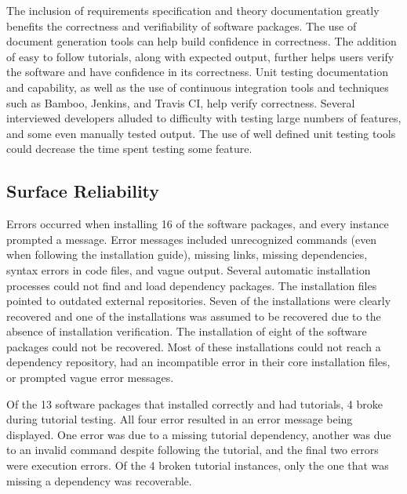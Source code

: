 \documentclass[12pt, notitlepage]{article}
\begin{document}
The inclusion of requirements specification and theory documentation greatly benefits the correctness and verifiability of software packages. The use of document generation tools can help build confidence in correctness. The addition of easy to follow tutorials, along with expected output, further helps users verify the software and have confidence in its correctness. Unit testing documentation and capability, as well as the use of continuous integration tools and techniques such as Bamboo, Jenkins, and Travis CI, help verify correctness. Several interviewed developers alluded to difficulty with testing large numbers of features, and some even manually tested output. The use of well defined unit testing tools could decrease the time spent testing some feature.

\subsection{Surface Reliability}

Errors occurred when installing 16 of the software packages, and every instance prompted a message. Error messages included unrecognized commands (even when following the installation guide), missing links, missing dependencies, syntax errors in code files, and vague output. Several automatic installation processes could not find and load dependency packages. The installation files pointed to outdated external repositories. Seven of the installations were clearly recovered and one of the installations was assumed to be recovered due to the absence of installation verification. The installation of eight of the software packages could not be recovered. Most of these installations could not reach a dependency repository, had an incompatible error in their core installation files, or prompted vague error messages. 

Of the 13 software packages that installed correctly and had tutorials, 4 broke during tutorial testing. All four error resulted in an error message being displayed. One error was due to a missing tutorial dependency, another was due to an invalid command despite following the tutorial, and the final two errors were execution errors. Of the 4 broken tutorial instances, only the one that was missing a dependency was recoverable. 
\end{document}
